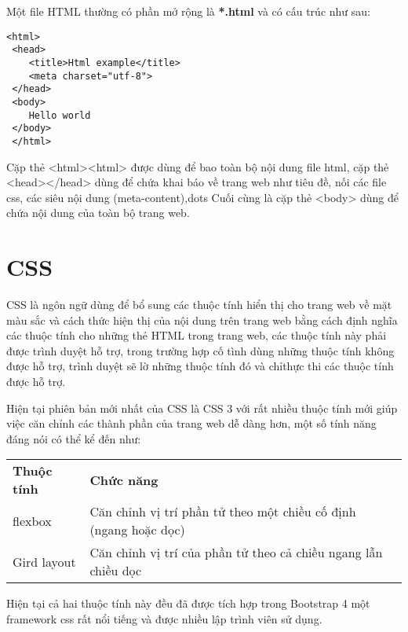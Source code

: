 Một file HTML thường có phần mở rộng là \textbf{*.html} và có cấu trúc như sau:
\lstset{language=Html}
\begin{center}
	\begin{lstlisting}[frame=single]
 <html>
 <head>
    <title>Html example</title>
    <meta charset="utf-8">
 </head>
 <body>
    Hello world
 </body>
 </html>
\end{lstlisting}
\end{center}
Cặp thẻ <html><html> được dùng để bao toàn bộ nội dung file html, cặp thẻ <head></head> dùng để chứa khai báo về trang web như tiêu đề, nối các file css, các siêu nội dung (meta-content),dots Cuối cùng là cặp thẻ <body> dùng để chứa nội dung của toàn bộ trang web.
\section{CSS}
CSS là ngôn ngữ dùng để bổ sung các thuộc tính hiển thị cho trang web về mặt màu sắc và cách thức hiện thị của nội dung trên trang web bằng cách định nghĩa các thuộc tính cho những thẻ HTML trong trang web, các thuộc tính này phải được trình duyệt hỗ trợ, trong trường hợp cố tình dùng những thuộc tính không được hỗ trợ, trình duyệt sẽ lờ những thuộc tính đó và chỉthực thi các thuộc tính được hỗ trợ.\par
Hiện tại phiên bản mới nhất của CSS là CSS 3 với rất nhiều thuộc tính mới giúp việc căn chỉnh các thành phần của trang web dễ dàng hơn, một số tính năng đáng nói có thể kể đến như:

\begin{table}[h!]
	\centering
	\begin{tabular}{|l|l|}
		\cline{1-2}
		\textbf{Thuộc tính} & \textbf{Chức năng}                                               \\ \cline{1-2}
		flexbox             & Căn chỉnh vị trí phần tử theo một chiều cố định (ngang hoặc dọc) \\ \cline{1-2}
		Gird layout         & Căn chỉnh vị trí của phần tử theo cả chiều ngang lẫn chiều dọc   \\ \cline{1-2}
	\end{tabular}
\end{table}

Hiện tại cả hai thuộc tính này đều đã được tích hợp trong Bootstrap 4 một framework css rất nổi tiếng và được nhiều lập trình viên sử dụng.
